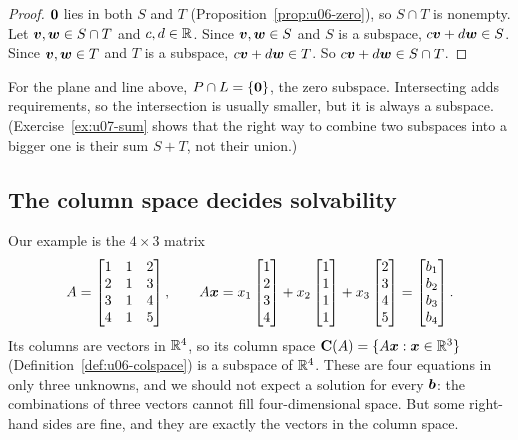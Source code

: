 \begin{proof}
$\boldsymbol{0}$ lies in both $S$ and $T$ (Proposition~\ref{prop:u06-zero}), so $S\cap T$ is nonempty.
Let $\boldsymbol{v},\boldsymbol{w}\in S\cap T$ and $c,d\in\mathbb{R}$. Since $\boldsymbol{v},\boldsymbol{w}\in S$ and $S$ is a subspace,
$c\boldsymbol{v}+d\boldsymbol{w}\in S$. Since $\boldsymbol{v},\boldsymbol{w}\in T$ and $T$ is a subspace, $c\boldsymbol{v}+d\boldsymbol{w}\in T$.
So $c\boldsymbol{v}+d\boldsymbol{w}\in S\cap T$.
\end{proof}

For the plane and line above, $P\cap L=\{\boldsymbol{0}\}$, the zero subspace. Intersecting adds
requirements, so the intersection is usually smaller, but it is always a subspace.
(Exercise~\ref{ex:u07-sum} shows that the right way to combine two subspaces into a bigger
one is their sum $S+T$, not their union.)

\subsection{The column space decides solvability}

Our example is the $4\times3$ matrix
\begin{equation}\label{eq:u07-A}
  A=\begin{bmatrix} 1&1&2\\ 2&1&3\\ 3&1&4\\ 4&1&5\end{bmatrix},\qquad
  A\boldsymbol{x}=x_1\begin{bmatrix}1\\2\\3\\4\end{bmatrix}+x_2\begin{bmatrix}1\\1\\1\\1\end{bmatrix}
         +x_3\begin{bmatrix}2\\3\\4\\5\end{bmatrix}=\begin{bmatrix}b_1\\b_2\\b_3\\b_4\end{bmatrix}.
\end{equation}
Its columns are vectors in $\mathbb{R}^4$, so its column space
$\mathbf{C}(A)=\{A\boldsymbol{x}:\boldsymbol{x}\in\mathbb{R}^3\}$ (Definition~\ref{def:u06-colspace}) is a subspace of
$\mathbb{R}^4$. These are four equations in only three unknowns, and we should not expect a solution
for every $\boldsymbol{b}$: the combinations of three vectors cannot fill four-dimensional space.
But some right-hand sides are fine, and they are exactly the vectors in the column space.

